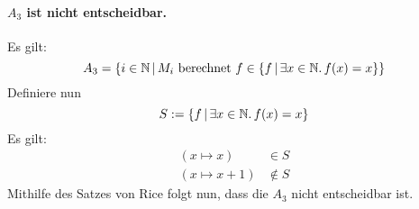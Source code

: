 \paragraph{$A_3$ ist nicht entscheidbar.}
Es gilt:
\[
	A_3 = \{ i \in \mathbb{N} \,|\, M_i \text{ berechnet } f \in \{f \,|\,
	\exists x \in \mathbb{N} .\, f(x) = x\} \}
\]
Definiere nun
\[
	S := \{f \,|\, \exists x \in \mathbb{N} .\, f(x) = x\}
\]
Es gilt:
\begin{align*}
	(x \mapsto x) & \in S \\
	(x \mapsto x+1) & \notin S
\end{align*}
Mithilfe des Satzes von Rice folgt nun, dass die $A_3$ nicht entscheidbar ist.
\par

